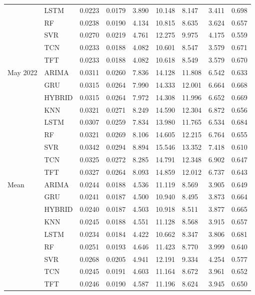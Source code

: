 \begin{tabular}{lllllllll}
 & LSTM & 0.0223 & 0.0179 & 3.890 & 10.148 & 8.147 & 3.411 & 0.698 \\
 & RF & 0.0238 & 0.0190 & 4.134 & 10.815 & 8.635 & 3.624 & 0.657 \\
 & SVR & 0.0270 & 0.0219 & 4.761 & 12.275 & 9.975 & 4.175 & 0.559 \\
 & TCN & 0.0233 & 0.0188 & 4.082 & 10.601 & 8.547 & 3.579 & 0.671 \\
 & TFT & 0.0233 & 0.0188 & 4.082 & 10.618 & 8.549 & 3.579 & 0.670 \\
May 2022 & ARIMA & 0.0311 & 0.0260 & 7.836 & 14.128 & 11.808 & 6.542 & 0.633 \\
 & GRU & 0.0315 & 0.0264 & 7.990 & 14.333 & 12.001 & 6.664 & 0.668 \\
 & HYBRID & 0.0315 & 0.0264 & 7.972 & 14.308 & 11.996 & 6.652 & 0.669 \\
 & KNN & 0.0321 & 0.0271 & 8.249 & 14.590 & 12.304 & 6.872 & 0.656 \\
 & LSTM & 0.0307 & 0.0259 & 7.834 & 13.980 & 11.765 & 6.534 & 0.684 \\
 & RF & 0.0321 & 0.0269 & 8.106 & 14.605 & 12.215 & 6.764 & 0.655 \\
 & SVR & 0.0342 & 0.0294 & 8.894 & 15.546 & 13.352 & 7.418 & 0.610 \\
 & TCN & 0.0325 & 0.0272 & 8.285 & 14.791 & 12.348 & 6.902 & 0.647 \\
 & TFT & 0.0327 & 0.0264 & 8.093 & 14.859 & 12.012 & 6.737 & 0.643 \\
Mean & ARIMA & 0.0244 & 0.0188 & 4.536 & 11.119 & 8.569 & 3.905 & 0.649 \\
 & GRU & 0.0241 & 0.0187 & 4.500 & 10.940 & 8.495 & 3.873 & 0.664 \\
 & HYBRID & 0.0240 & 0.0187 & 4.503 & 10.918 & 8.511 & 3.877 & 0.665 \\
 & KNN & 0.0245 & 0.0188 & 4.551 & 11.128 & 8.568 & 3.915 & 0.657 \\
 & LSTM & 0.0234 & 0.0184 & 4.422 & 10.662 & 8.347 & 3.806 & 0.681 \\
 & RF & 0.0251 & 0.0193 & 4.646 & 11.423 & 8.770 & 3.999 & 0.640 \\
 & SVR & 0.0268 & 0.0205 & 4.941 & 12.191 & 9.334 & 4.254 & 0.577 \\
 & TCN & 0.0245 & 0.0191 & 4.603 & 11.164 & 8.672 & 3.961 & 0.652 \\
 & TFT & 0.0246 & 0.0190 & 4.587 & 11.196 & 8.624 & 3.945 & 0.650 \\
\bottomrule
\end{tabular}
